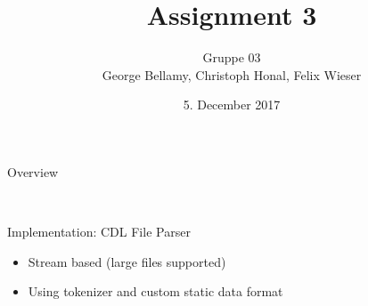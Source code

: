 \documentclass[shortpres]{beamer}
\title[{Tsunami simulation}]{Assignment 3}
\author[Bellamy, Honal, Wieser]{Gruppe 03\\George Bellamy, Christoph Honal, Felix Wieser\\\vspace{10pt}{\small Bachelorpraktikum}}
\institute[TU M\"unchen]{Technical University of Munich}
\date{5. December 2017}
\begin{document}
\maketitle

\begin{frame}{Overview}
	\begin{figure}
		\hspace{40pt}
		\hspace{0pt}\vspace{20pt}\\
	\end{figure}
\end{frame}

\begin{frame}{Implementation: CDL File Parser}
	\begin{itemize}
		\item Stream based (large files supported)
		\item Using tokenizer and custom static data format
	\end{itemize}
\end{frame}
\end{document}
